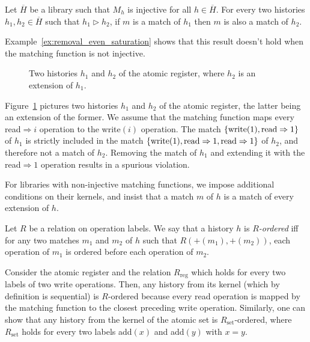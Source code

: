 \begin{lemma}
  \label{lem:match_extension1}

  Let $\overline{H}$ be a library such that $M_h$ is injective for all $h\in
  \overline{H}$. For every two histories $h_1, h_2\in \overline{H}$ such that
  $h_1 \vartriangleright h_2$, if $m$ is a match of $h_1$ then $m$ is also a
  match of $h_2$.

\end{lemma}

Example~\ref{ex:removal_even_saturation} shows that this result doesn't hold
when the matching function is not injective.

\begin{figure}

  

  \caption{Two histories $h_1$ and $h_2$ of the atomic register, where $h_2$ is
  an extension of $h_1$.}
  \label{fig:removal_even_saturation}

\end{figure}

\begin{example}
  \label{ex:removal_even_saturation}

  Figure~\ref{fig:removal_even_saturation} pictures two histories $h_1$ and
  $h_2$ of the atomic register, the latter being an extension of the former. We
  assume that the matching function maps every read$\Rightarrow i$ operation to
  the write$(i)$ operation. The match ${\{  \text{write}(1),
  \text{read}\Rightarrow 1  \}}$ of $h_1$ is strictly included in the match ${\{ 
  \text{write}(1), \text{read}\Rightarrow 1, \text{read}\Rightarrow 1  \}}$ of
  $h_2$, and therefore not a match of $h_2$. Removing the match of $h_1$ and
  extending it with the read$\Rightarrow 1$ operation results in a spurious
  violation.

\end{example}

For libraries with non-injective matching functions, we impose additional
conditions on their kernels, and insist that a match $m$ of $h$ is a match of
every extension of $h$.

Let $R$ be a relation on operation labels. We say that a history $h$ is
\emph{$R$-ordered} iff for any two matches $m_1$ and $m_2$ of $h$ such that
$R(+(m_1), +(m_2))$, each operation of $m_1$ is ordered before each operation
of $m_2$.

Consider the atomic register and the relation $R_\mathrm{reg}$ which holds for
every two labels of two write operations. Then, any history from its kernel
(which by definition is sequential) is $R$-ordered because every read operation
is mapped by the matching function to the closest preceding write operation.
Similarly, one can show that any history from the kernel of the atomic set is
$R_\mathrm{set}$-ordered, where $R_\mathrm{set}$ holds for every two labels
add$(x)$ and add$(y)$ with $x = y$.

